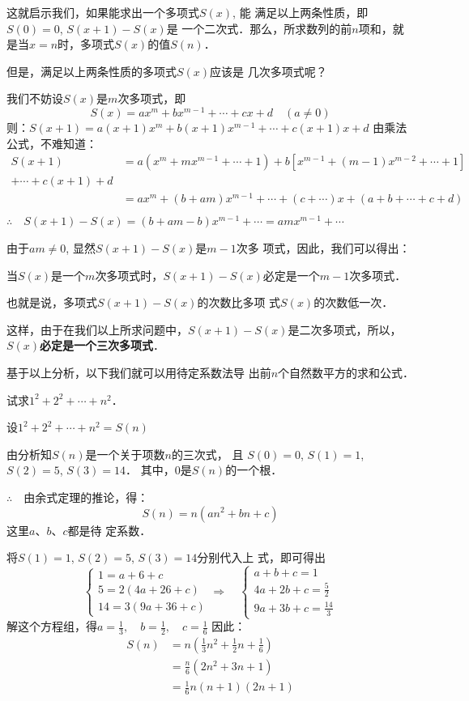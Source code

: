 这就启示我们，如果能求出一个多项式$S(x)$, 能
满足以上两条性质，即$S(0)=0$, $S(x+1)-S(x)$是
一个二次式．那么，所求数列的前$n$项和，就是当$x
=n$时，多项式$S(x)$的值$S(n)$．

但是，满足以上两条性质的多项式$S(x)$应该是
几次多项式呢？

我们不妨设$S(x)$是$m$次多项式，即
\[S(x)=ax^m+bx^{m-1}+\cdots+cx+d\quad (a\ne 0)\]
则：$S(x+1)=a(x+1)x^m+b(x+1)x^{m-1}+\cdots+c(x+1)x+d$
由乘法公式，不难知道：
\[\begin{split}
    S(x+1)&= a(x^m+mx^{m-1}+\cdots +1)+b[x^{m-1}+(m-1)x^{m-2}+\cdots+1]\\
    +\cdots + c(x+1)+d\\
    &=ax^m+(b+am)x^{m-1}+\cdots +(c+\cdots)x+(a+b+\cdots +c+d)\\
\end{split}\]
$\therefore\quad S(x+1)-S(x)=(b+am-b)x^{m-1}+\cdots =amx^{m-1}+\cdots$

由于$am\ne 0$, 显然$S(x+1)-S(x)$是$m-1$次多
项式，因此，我们可以得出：

\begin{blk}{}
    当$S(x)$是一个$m$次多项式时，$S(x+1)-S(x)$必定是一个$m-1$次多项式．
\end{blk}

也就是说，多项式$S(x+1)-S(x)$的次数比多项
式$S(x)$的次数低一次．

这样，由于在我们以上所求问题中，$S(x+1)-S(x)$是二次多项式，所以，
\textbf{$S(x)$必定是一个三次多项式}．

基于以上分析，以下我们就可以用待定系数法导
出前$n$个自然数平方的求和公式．


\begin{example}
    试求$1^2+2^2+\cdots+n^2$．
\end{example}


\begin{solution}
    设$1^2+2^2+\cdots+n^2=S(n)$

由分析知$S(n)$是一个关于项数$n$的三次式，
且 $S(0)=0$, $S(1)=1$, $S(2)=5$, $S(3)=14$．
其中，0是$S(n)$的一个根．

$\therefore\quad $由余式定理的推论，得：
\[S(n)=n(an^2+bn+c)\]
这里$a$、$b$、$c$都是待
定系数．

将$S(1)=1$, $S(2)=5$, $S(3)=14$分别代入上
式，即可得出
\[\begin{cases}
    1=a+6+c\\
5=2(4a+26+c)\\
14=3(9a+36+c)
\end{cases}\Rightarrow\quad \begin{cases}
    a+b+c=1\\
4a+2b+c=\frac{5}{2}\\
9a+3b+c=\frac{14}{3}
\end{cases}\]
解这个方程组，得$a=\frac{1}{3},\quad b=\frac{1}{2},\quad c=\frac{1}{6}$
因此：
\[\begin{split}
    S(n)&=n\left(\frac{1}{3}n^2+\frac{1}{2}n+\frac{1}{6}\right)\\
&=\frac{n}{6}(2n^2+3n+1)\\
&=\frac{1}{6}n(n+1)(2n+1)
\end{split}\]
\end{solution}


